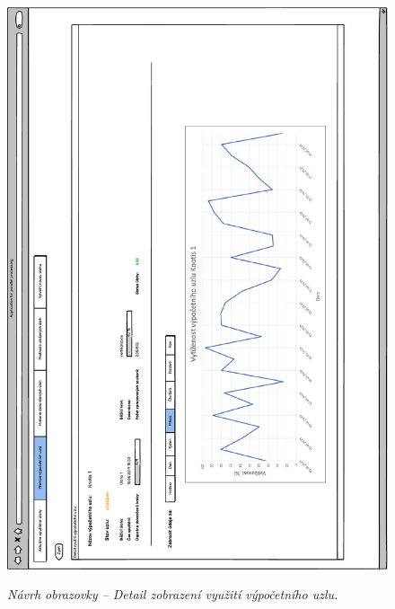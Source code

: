 \begin{figure}[H]
\begin{center}
    \scalebox{0.78}
    {   
        \includegraphics{images/wireframe_appendix_nodeUsageDetail.pdf}
    }
    \caption{\label{obr:wireframe_appendix_nodeUsageDetail} {\it Návrh obrazovky -- Detail zobrazení využití výpočetního uzlu.}}
\end{center}
\end{figure}


